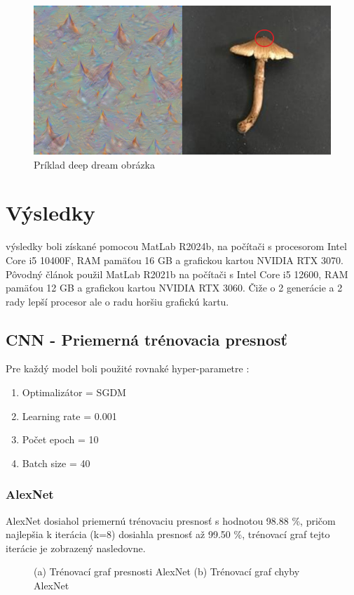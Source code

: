 \documentclass[journal,onecolumn]{IEEEtran}
\begin{document}
\begin{figure}[!htb]
    \centering
    \includegraphics[width=0.6\linewidth]{Images/dp_example.png}
    \caption{Príklad deep dream obrázka}
    \label{fig:enter-label}
\end{figure}

\newpage

\section{Výsledky}
 výsledky boli získané pomocou MatLab R2024b, na počítači s procesorom Intel Core i5 10400F, RAM pamäťou 16 GB a grafickou kartou NVIDIA RTX 3070. Pôvodný článok použil MatLab R2021b na počítači s Intel Core i5 12600, RAM pamäťou 12 GB a grafickou kartou NVIDIA RTX 3060. Čiže o 2 generácie a 2 rady lepší procesor ale o radu horšiu grafickú kartu.

\subsection{CNN - Priemerná trénovacia presnosť}
Pre každý model boli použité rovnaké hyper-parametre :
\begin{enumerate}
  \item Optimalizátor = SGDM
  \item Learning rate = 0.001
  \item Počet epoch = 10
  \item Batch size = 40
\end{enumerate}

\subsubsection{AlexNet}
AlexNet dosiahol priemernú trénovaciu presnosť s hodnotou 98.88 \%, pričom najlepšia k iterácia (k=8) dosiahla presnosť až 99.50 \%, trénovací graf tejto iterácie je zobrazený nasledovne.

\begin{figure}[!htb]
    \centering
    \caption{(a) Trénovací graf presnosti AlexNet (b) Trénovací graf chyby AlexNet}
    \label{fig:foobar}
\end{figure}
\end{document}
